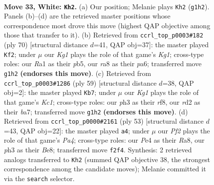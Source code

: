 \documentclass[11pt]{article}
\begin{document}
\clearpage

\begin{figure}[p]\centering
\begin{subfigure}{0.46\textwidth}\centering
\resizebox{\linewidth}{!}{%
\newchessgame
\chessboard[
  setfen={r7/pp3pk1/8/7p/bP2P3/P5Pp/3r1P2/RBR3K1 w - - 2 33},
  showmover=false,
  pgfstyle=straightmove, color=movearrow, markmove={g1-h2}
]}
\caption{}
\end{subfigure}\hfill
\begin{subfigure}{0.46\textwidth}\centering
\resizebox{\linewidth}{!}{%
\newchessgame
\chessboard[
  setfen={7k/7p/p4p2/1p1Bp3/1P6/5P1b/P1r1P2P/3R2K1 w - - 4 36},
  showmover=false,
  pgfstyle=straightmove, color=movearrow, markmove={g1-f2}
]}
\caption{}
\end{subfigure}
\\[4pt]
\begin{subfigure}{0.46\textwidth}\centering
\resizebox{\linewidth}{!}{%
\newchessgame
\chessboard[
  setfen={2k2R2/B2b4/1p2rp2/2p3pp/8/3P1P2/PP1K2PP/8 b - - 2 30},
  showmover=false,
  pgfstyle=straightmove, color=movearrow, markmove={c8-b7}
]}
\caption{}
\end{subfigure}\hfill
\begin{subfigure}{0.46\textwidth}\centering
\resizebox{\linewidth}{!}{%
\newchessgame
\chessboard[
  setfen={r3b1k1/1p5p/3R2p1/p4p2/8/1PB4P/P4PP1/6K1 b - - 0 27},
  showmover=false,
  pgfstyle=straightmove, color=movearrow, markmove={a5-a4}
]}
\caption{}
\end{subfigure}
\caption{\textbf{Move 33, White: \texttt{Kh2}.} (a) Our position; Melanie plays \texttt{Kh2} (\texttt{g1h2}). Panels (b)--(d) are the retrieved master positions whose correspondence most drove this move (highest QAP objective among those that transfer to it). (b) Retrieved from \texttt{ccrl\_top\_p0003\#182} (ply 70) [structural distance $d$=41, QAP obj=37]: the master played \texttt{Kf2}; under $\mu$ our \emph{Kg1} plays the role of that game's \emph{Kg1}; cross-type roles: our \emph{R}a1 as their \emph{p}b5, our \emph{r}a8 as their \emph{p}a6; transferred move \texttt{g1h2} \textbf{(endorses this move)}. (c) Retrieved from \texttt{ccrl\_top\_p0003\#1286} (ply 59) [structural distance $d$=38, QAP obj=2]: the master played \texttt{Kb7}; under $\mu$ our \emph{Kg1} plays the role of that game's \emph{Kc1}; cross-type roles: our \emph{p}h3 as their \emph{r}f8, our \emph{r}d2 as their \emph{b}a7; transferred move \texttt{g1h2} \textbf{(endorses this move)}. (d) Retrieved from \texttt{ccrl\_top\_p0000\#2161} (ply 53) [structural distance $d$=43, QAP obj=22]: the master played \texttt{a4}; under $\mu$ our \emph{Pf2} plays the role of that game's \emph{Pa4}; cross-type roles: our \emph{P}e4 as their \emph{R}a8, our \emph{p}h3 as their \emph{B}e8; transferred move \texttt{f2f4}. Synthesis: 2 retrieved analogs transferred to \texttt{Kh2} (summed QAP objective 38, the strongest correspondence among the candidate moves); Melanie committed it via the \texttt{search} selector.}
\label{fig:thought-m64}
\end{figure}
\end{document}
